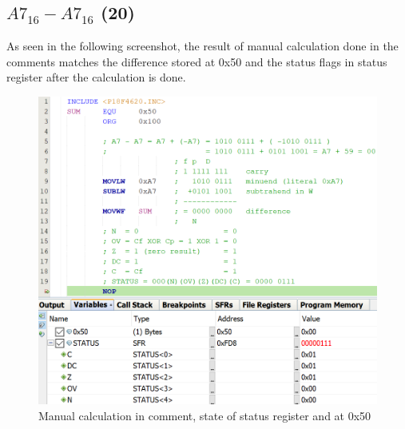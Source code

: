 \documentclass{article}
\begin{document}
\subsection{$A7_{16}-A7_{16}$ (20)}
As seen in the following screenshot, the result of manual calculation done in the comments matches the difference stored at 0x50 and the status flags in status register after the calculation is done.
\begin{figure}[H]
  \centering
  \includegraphics[width=\textwidth]{ECE3301_Assignment2_Sub.png}
  \caption{Manual calculation in comment, state of status register and at 0x50}
\end{figure}
\end{document}
